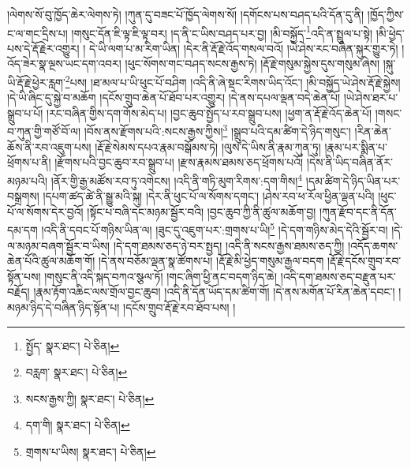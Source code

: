 །ལེགས་སོ་བུ་ཁྱོད་ཆེར་ལེགས་ཏེ། །ཀུན་དུ་བཟང་པོ་ཁྱོད་ལེགས་སོ། །དགོངས་པས་བཤད་པའི་དོན་དུ་ནི། །ཁྱོད་ཀྱིས་ང་ལ་གང་དྲིས་པ། །གསུང་དོན་ཇི་ལྟ་ཇི་ལྟ་བར། །ད་ནི་ང་ཡིས་བཤད་པར་བྱ། །མི་བསྐྱོད་\footnote{སྤྱོད་  སྣར་ཐང་།  པེ་ཅིན། }འདི་ན་སྤྲུལ་པ་སྟེ། །མི་ཕྱེད་པས་དེ་རྡོ་རྗེར་འགྱུར། །
དེ་ཡི་ལག་པ་མ་རིག་ཡིན། །དེར་ནི་རྡོ་རྗེ་འོད་གསལ་བའོ། །ཡེ་ཤེས་རང་བཞིན་སྐུར་གྱུར་ཏེ། །འོད་ཟེར་སྣ་ལྔས་ཡང་དག་འབར། །ཕུང་སོགས་གང་བཤད་སངས་རྒྱས་ཏེ། །རྡོ་རྗེ་གསུམ་སྐྱེས་དུས་གསུམ་ཞེས། །སྐུ་ཡི་རྡོ་རྗེ་ཕྱེར་རླག་\footnote{བརླག་  སྣར་ཐང་།  པེ་ཅིན། }པས། །ཐ་མལ་པ་ཡི་ཕུང་པོ་བཤིག །འདི་ནི་ཞེ་སྡང་རིགས་ཡིད་འོང་། །མི་བསྐྱོད་ཡེ་ཤེས་རྡོ་རྗེ་སྐྱེས། །དེ་ཡི་ཞིང་དུ་སྐྱེ་བ་མཆོག །དངོས་གྲུབ་ཆེན་པོ་ཐོབ་པར་འགྱུར། །དེ་ནས་དཔལ་ལྡན་བདེ་ཆེན་པོ། །ཡེ་ཤེས་ཐར་པ་སྒྲུབ་པ་པོ། །རང་བཞིན་གྱིས་དག་གོས་མེད་པ། །བྱང་ཆུབ་སྤྱོད་པ་རབ་སྒྲུབ་པས། །ཕྱག་ན་རྡོ་རྗེ་འོད་ཆེན་པོ། །གསང་བ་ཀུན་གྱི་གཙོ་བོ་ལ། །བོས་ནས་རྫོགས་པའི་:སངས་རྒྱས་ཀྱིས།\footnote{སངས་རྒྱས་ཀྱི།  སྣར་ཐང་།  པེ་ཅིན། } །སྒྲུབ་པའི་དམ་ཚིག་དེ་ཉིད་གསུང་། །རིན་ཆེན་ཆོས་ནི་རབ་འཇུག་པས། །རྡོ་རྗེ་སེམས་དཔའ་རྣམ་བསྒོམས་ཏེ། །ལུས་དེ་ཡིས་ནི་རྣམ་ཀུན་ཏུ། །རྣམ་པར་སྨིན་པ་ཕྲོགས་པ་ནི། །རྫོགས་པའི་བྱང་ཆུབ་རབ་སྒྲུབ་པ། །རྫས་རྣམས་ཐམས་ཅད་ཕྲོགས་པའོ། །དེས་ནི་ཡིད་བཞིན་ནོར་མཉམ་པའི། །ནོར་གྱི་རྒྱ་མཚོས་རབ་ཏུ་འགེངས། །འདི་ནི་གཏི་མུག་རིགས་:དག་གིས།\footnote{དག་གི།  སྣར་ཐང་།  པེ་ཅིན། } །དམ་ཚིག་དེ་ཉིད་ཡིན་པར་བསྒྲགས། །དཔག་ཚད་ཚེ་ནི་སྒྱུ་མའི་སྐུ། །དེར་ནི་ཕུང་པོ་ལ་སོགས་དགང་། །ཤེས་རབ་ཕ་རོལ་ཕྱིན་ལྡན་པའི། །ཕུང་པོ་ལ་སོགས་དེར་བྱའོ། །སྟོང་པ་བཞི་དང་མཉམ་སྦྱོར་བའི། །བྱང་ཆུབ་ཀྱི་ནི་ཚུལ་མཆོག་བྱ། །ཀུན་རྫོབ་དང་ནི་དོན་དམ་དག །འདི་ནི་དབང་པོ་གཉིས་ཡིན་ལ། །ཟུང་དུ་འཇུག་པར་:གྲགས་པ་ཡི།\footnote{གྲགས་པ་ཡིས།  སྣར་ཐང་།  པེ་ཅིན། } །དེ་དག་གཉིས་མེད་དེའི་སྦྱོར་བ། །དེ་ལ་མཉམ་བཞག་སྦྱོར་བ་ཡིས། །དེ་དག་ཐམས་ཅད་ཉེ་བར་སྤྱད། །འདི་ནི་སངས་རྒྱས་ཐམས་ཅད་ཀྱི། །འདོད་ཆགས་ཆེན་པོའི་ཚུལ་མཆོག་གོ། །དེ་ནས་བཅོམ་ལྡན་སྣ་ཚོགས་པ། །རྡོ་རྗེ་མི་ཕྱེད་གསུམ་རྒྱལ་བདག །རྡོ་རྗེ་དངོས་གྲུབ་རབ་སྟོན་པས། །གསུང་ནི་འདི་སྐད་བཀའ་སྩལ་ཏོ། །གང་ཞིག་ཕྱི་ནང་བདག་ཉིད་ཆེ། །འདི་དག་ཐམས་ཅད་བརྫུན་པར་བརྗོད། །རྣམ་རྟོག་འཆིང་ལས་གྲོལ་བྱང་ཆུབ། །འདི་ནི་དོན་ཡོད་དམ་ཚིག་གོ། །དེ་ནས་མགོན་པོ་རིན་ཆེན་དབང་། །མཉམ་ཉིད་དེ་བཞིན་ཉིད་སྟོན་པ། །དངོས་གྲུབ་རྡོ་རྗེ་རབ་ཐོབ་པས། །
